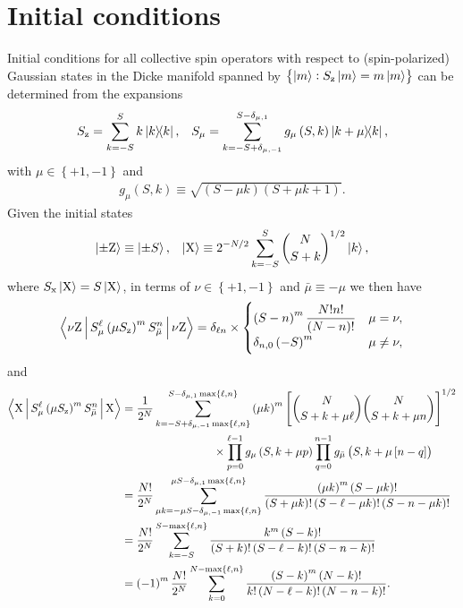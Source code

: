 \documentclass[aps,11pt,notitlepage,nofootinbib,longbibliography]{revtex4-1}
\newcommand{\f}[2]{\dfrac{#1}{#2}} %
\newcommand{\p}[1]{\left(#1\right)} %
\renewcommand{\sp}[1]{\left[#1\right]} %
\renewcommand{\set}[1]{\left\{#1\right\}} %
\newcommand{\bk}{\Braket} %
\newcommand{\z}{\text{z}}
\newcommand{\x}{\text{x}}
\newcommand{\Z}{\text{Z}}
\newcommand{\X}{\text{X}}
\newcommand{\bmu}{{\bar\mu}}
\newcommand{\1}{\mathds{1}}
\begin{document}
\section{Initial conditions}
\label{sec:initial_conditions}

Initial conditions for all collective spin operators with respect to
(spin-polarized) Gaussian states in the Dicke manifold spanned by
$\set{\ket{m}:S_\z\ket{m}=m\ket{m}}$ can be determined from the
expansions
\begin{align}
  S_\z = \sum_{k=-S}^S k \op{k},
  &&
  S_\mu = \sum_{k=-S+\delta_{\mu,-1}}^{S-\delta_{\mu,1}}
  g_\mu\p{S,k} \op{k+\mu}{k},
\end{align}
with $\mu\in\set{+1,-1}$ and
\begin{align}
  g_\mu\p{S,k} \equiv \sqrt{\p{S-\mu k}\p{S+\mu k+1}}.
\end{align}
Given the initial states
\begin{align}
  \ket{\pm\Z} \equiv \ket{\pm S},
  &&
  \ket{\X} \equiv 2^{-N/2} \sum_{k=-S}^S
  { N \choose S+k }^{1/2} \ket{k},
\end{align}
where $S_\x\ket{\X}=S\ket{\X}$, in terms of $\nu\in\set{+1,-1}$ and
$\bmu\equiv-\mu$ we then have
\begin{align}
  \bk{\nu\Z|S_\mu^\ell \p{\mu S_\z}^m S_\bmu^n|\nu\Z}
  = \delta_{\ell n} \times
  \begin{cases}
     \p{S-n}^m \f{N! n!}{\p{N-n}!} & \mu = \nu, \\
     \delta_{n,0} \p{-S}^m & \mu \ne \nu,
  \end{cases}
\end{align}
and
\begin{align}
  \bk{\X|S_\mu^\ell \p{\mu S_\z}^m S_\bmu^n|\X}
  &=  \f1{2^N} \sum_{k=-S+\delta_{\mu,-1}\max\set{\ell,n}}
  ^{S-\delta_{\mu,1}\max\set{\ell,n}} \p{\mu k}^m
  \sp{{ N \choose S+k+\mu\ell } { N \choose S+k+\mu n }}^{1/2}
  \notag \\
  &\qquad\qquad\qquad\qquad
  \times \prod_{p=0}^{\ell-1} g_\mu\p{S,k+\mu p}
  \prod_{q=0}^{n-1} g_\bmu\p{S,k+\mu\sp{n-q}} \\
  &= \f{N!}{2^N} \sum_{\mu k=-\mu S-\delta_{\mu,-1}\max\set{\ell,n}}
  ^{\mu S-\delta_{\mu,1}\max\set{\ell,n}}
  \f{\p{\mu k}^m \p{S-\mu k}!}
  {\p{S+\mu k}!\p{S-\ell-\mu k}!\p{S-n-\mu k}!} \\
  &= \f{N!}{2^N} \sum_{k=-S}^{S-\max\set{\ell,n}}
  \f{k^m \p{S-k}!}{\p{S+k}!\p{S-\ell-k}!\p{S-n-k}!} \\
  &= \p{-1}^m\f{N!}{2^N} \sum_{k=0}^{N-\max\set{\ell,n}}
  \f{\p{S-k}^m \p{N-k}!}{k!\p{N-\ell-k}!\p{N-n-k}!}.
\end{align}
\end{document}
